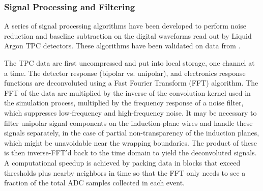 \subsubsection{Signal Processing and Filtering}

A series of signal processing algorithms have been developed to
perform noise reduction and baseline subtraction on the digital
waveforms read out by Liquid Argon TPC detectors. 
These algorithms have been validated on data from 
.

The TPC data are first uncompressed and put into local storage, one
channel at a time.  
The detector response (bipolar vs. unipolar), and
electronics response functions are deconvoluted using a Fast Fourier
Transform (FFT) algorithm.  The FFT of the data are multiplied by the
inverse of the convolution kernel used in the simulation process,
multiplied by the frequency response of a noise filter, which
suppresses low-frequency and high-frequency noise.  It may be
necessary to filter unipolar signal components on the induction-plane
wires and handle these signals separately, in the case of partial
non-transparency of the induction planes, which might be unavoidable
near the wrapping boundaries.  The product of these is then
inverse-FFT'd back to the time domain to yield the deconvoluted
signals.  A computational speedup is achieved by packing data in
blocks that exceed thresholds plus nearby neighbors in time so that
the FFT only needs to see a fraction of the total ADC samples
collected in each event.

